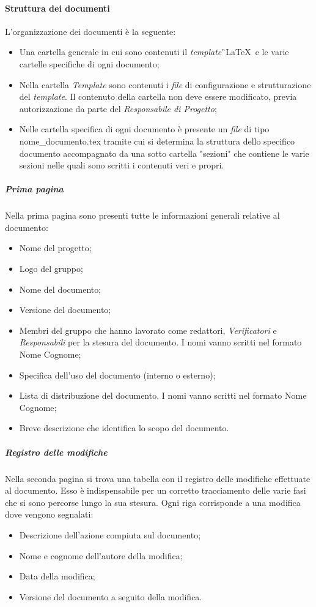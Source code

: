 \paragraph{Struttura dei documenti}
L'organizzazione dei documenti è la seguente: 
\begin{itemize}
	\item Una cartella generale in cui sono contenuti il \textit{template}\G\ \LaTeX\ e le varie cartelle specifiche di ogni documento;
	\item Nella cartella \textit{Template} sono contenuti i \textit{file} di configurazione e strutturazione del \textit{template}. Il contenuto della cartella non deve essere modificato, previa autorizzazione da parte del \textit{Responsabile di Progetto};
	\item Nelle cartella specifica di ogni documento è presente un \textit{file} di tipo nome\_documento.tex tramite cui si determina la struttura dello specifico documento accompagnato da una sotto cartella "sezioni" che contiene le varie sezioni nelle quali sono scritti i contenuti veri e propri.
\end{itemize}

\subparagraph{Prima pagina}
\label{sec:primaPagina}
Nella prima pagina sono presenti tutte le informazioni generali relative al documento:
\begin{itemize}
	\item Nome del progetto;
	\item Logo del gruppo;
	\item Nome del documento;
	\item Versione del documento;
	\item Membri del gruppo che hanno lavorato come redattori, \textit{Verificatori} e \textit{Responsabili} per la stesura del documento. I nomi vanno scritti nel formato Nome Cognome;
	\item Specifica dell'uso del documento (interno o esterno);
	\item Lista di distribuzione del documento. I nomi vanno scritti nel formato Nome Cognome;
	\item Breve descrizione che identifica lo scopo del documento.
\end{itemize}
\subparagraph{Registro delle modifiche}
Nella seconda pagina si trova una tabella con il registro delle modifiche effettuate al documento. Esso è indispensabile per un corretto tracciamento delle varie fasi che si sono percorse lungo la sua stesura. Ogni riga corrisponde a una modifica dove vengono segnalati:
\begin{itemize}
	\item Descrizione dell'azione compiuta sul documento;
	\item Nome e cognome dell'autore della modifica;
	\item Data della modifica;
	\item Versione del documento a seguito della modifica.
\end{itemize}

